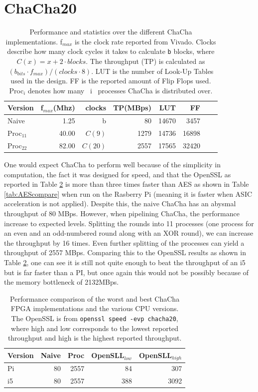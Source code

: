 \documentclass[a4paper, openany]{book}
\begin{document}
\section{ChaCha20}
\label{sec:org275d08d}
\begin{table}[!htb]
\centering
\captionsetup{width=.8\linewidth}
\begin{tabular}{l r r r r r r r}
\hline
Version & f$_{max}$(Mhz) & clocks & TP(MBps) & LUT & FF\\
\hline
Naive  & 1.25 & b & 80           & 14670 & 3457\\
Proc$_{11}$ & 40.00 & $C(9)$ & 1279 &  14736 & 16898\\
Proc$_{22}$ & 82.00 & $C(20)$ & 2557 & 17565 & 32420\\
\end{tabular}
\caption[ChaCha20: FPGA Versions]%
{Performance and statistics over the different ChaCha implementations. f$_{max}$ is the clock rate reported from Vivado. Clocks describe how many clock cycles it takes to calculate \texttt{b} blocks, where $C(x) = x+2 \cdot blocks$. The throughput (TP) is calculated as \((b_{bits}\cdot f_{max})/(clocks \cdot 8)\). LUT is the number of Look-Up Tables used in the design. FF is the reported amount of Flip Flops used. Proc$_{i}$ denotes how many ~i~ processes ChaCha is distributed over.}
\label{tab:ChaChaversions}
\end{table}
One would expect ChaCha to perform well because of the simplicity in computation, the fact it was designed for speed, and that the OpenSSL as reported in Table \ref{tab:ChaChacompare} is more than three times faster than AES as shown in Table \ref{tab:AEScompare} when run on the Rasberry Pi (meaning it is faster when ASIC acceleration is not applied). Despite this, the naive ChaCha has an abysmal throughput of 80 MBps. However, when pipelining ChaCha, the performance increase to expected levels. Splitting the rounds into 11 processes (one process for an even and an odd-numbered round along with an XOR round), we can increase the throughput by 16 times. Even further splitting of the processes can yield a throughput of 2557 MBps. Comparing this to the OpenSSL results as shown in Table \ref{tab:ChaChacompare}, one can see it is still not quite enough to beat the throughput of an i5 but is far faster than a PI, but once again this would not be possibly because of the memory bottleneck of 2132MBps.

\begin{table}[!htb]
\centering
\captionsetup{width=.8\linewidth}
\begin{tabular}{l r r r r}
\hline
\textbf{Version} & Naive & Proc & OpenSLL$_{low}$ & OpenSLL$_{high}$\\
\hline
Pi & 80 & 2557 & 84 & 307\\
i5 &  80  &  2557    & 388   & 3092
\end{tabular}
\caption[ChaCha20: FPGA and CPU comparisons]%
{Performance comparison of the worst and best ChaCha FPGA implementations and the various CPU versions. The OpenSSL is from \texttt{openssl speed -evp chacha20}, where high and low corresponds to the lowest reported throughput and high is the highest reported throughput.}
\label{tab:ChaChacompare}
\end{table}
\end{document}
